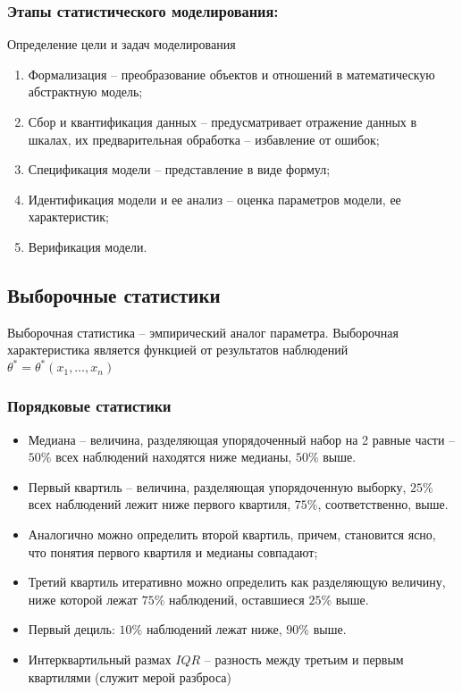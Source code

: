     \subsubsection*{Этапы статистического моделирования:}
    Определение цели и задач моделирования
    \begin{enumerate}
        \item Формализация -- преобразование объектов и отношений в математическую абстрактную модель;
        \item Сбор и квантификация данных -- предусматривает отражение данных в шкалах, их предварительная обработка -- избавление от ошибок;
        \item Спецификация модели -- представление в виде формул;
        \item Идентификация модели и ее анализ -- оценка параметров модели, ее характеристик;
        \item Верификация модели.
    \end{enumerate}
\subsection*{Выборочные статистики}

\par
Выборочная статистика -- эмпирический аналог параметра. Выборочная характеристика является функцией от результатов наблюдений $\theta^* = \theta^* \left(x_1, \ldots, x_n\right)$

\subsubsection*{Порядковые статистики}
\begin{itemize}
    \item Медиана -- величина, разделяющая упорядоченный набор на 2 равные части -- $50\%$ всех наблюдений находятся ниже медианы, $50 \%$ выше.
    \item Первый квартиль -- величина, разделяющая упорядоченную выборку, $25\%$ всех наблюдений лежит ниже первого квартиля, $75\%$, соответственно, выше.
    \item Аналогично можно определить второй квартиль, причем, становится ясно, что понятия первого квартиля и медианы совпадают;
    \item Третий квартиль итеративно можно определить как разделяющую величину, ниже которой лежат $75\%$ наблюдений, оставшиеся $25\%$ выше.
    \item Первый дециль: $10\%$ наблюдений лежат ниже, $90\%$ выше.
    \item Интерквартильный размах $IQR$ -- разность между третьим и первым квартилями (служит мерой разброса)
\end{itemize}
